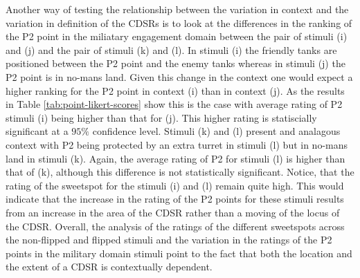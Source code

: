 \documentclass[11pt,letterpaper]{article}
\begin{document}
Another way of testing the relationship between the variation in context and the variation in definition of the CDSRs is to look at the differences in the ranking of the P2 point in the miliatary engagement domain between the pair of stimuli (i) and (j) and the pair of stimuli (k) and (l). In stimuli (i) the friendly tanks are positioned between the P2 point and the enemy tanks whereas in stimuli (j) the P2 point is in no-mans land. Given this change in the context one would expect a higher ranking for the P2 point in context (i) than in context (j). As the results in Table \ref{tab:point-likert-scores} show this is the case with average rating of P2  stimuli (i) being higher than that for (j). This higher rating is statiscially significant at a $95\%$ confidence level. Stimuli (k) and (l) present and analagous context with P2 being protected by an extra turret in stimuli (l) but in no-mans land in stimuli (k). Again, the average rating of P2 for stimuli (l) is higher than that of (k), although this difference is not statistically significant. Notice, that the rating of the sweetspot for the stimuli (i) and (l) remain quite high. This would indicate that the increase in the rating of the P2 points for these stimuli results from an increase in the area of the CDSR rather than a moving of the locus of the CDSR. Overall, the analysis of the ratings of the different sweetspots across the non-flipped and flipped stimuli and the variation in the ratings of the P2 points in the military domain stimuli point to the fact that both the location and the extent of a CDSR is contextually dependent.


\end{document}

